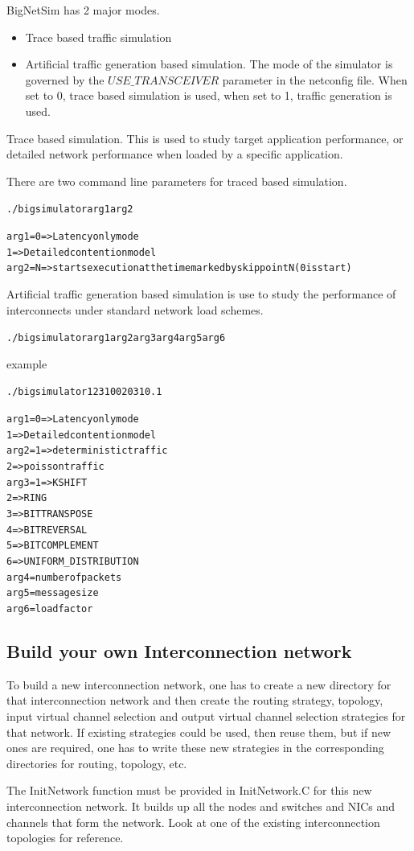 BigNetSim has 2 major modes.  

\begin{itemize}
\item{ Trace based traffic simulation }
\item{Artificial traffic generation based simulation.
The mode of the simulator is governed by the $USE\_TRANSCEIVER$ parameter
in the netconfig file.  When set to 0, trace based simulation is used,
when set to 1, traffic generation is used.}
\end{itemize}

Trace based simulation.  This is used to study target application
performance, or detailed network performance when loaded by a specific
application.

There are two command line parameters for traced based simulation.
\begin{alltt}./bigsimulator arg1 arg2\end{alltt}
\begin{alltt}
	arg1 = 0 => Latency only mode
	       1 => Detailed contention model
	arg2 = N => starts execution at the time marked by skip point N	(0 is start) 
\end{alltt}

Artificial traffic generation based simulation is use to study the performance of interconnects under standard network load schemes.


\begin{alltt}./bigsimulator arg1 arg2 arg3 arg4 arg5 arg6\end{alltt}
example
\begin{alltt}./bigsimulator 1 2 3 100 2031 0.1\end{alltt}

\begin{alltt}
	arg1 = 0 => Latency only mode
	       1 => Detailed contention model
	arg2 = 1 => deterministic traffic
	       2 => poisson traffic
	arg3 = 1 => KSHIFT 
	       2 => RING 
	       3 => BITTRANSPOSE 
	       4 => BITREVERSAL 
	       5 => BITCOMPLEMENT 
	       6 => UNIFORM\_DISTRIBUTION 
	arg4 = number of packets
	arg5 = message size
	arg6 = load factor
\end{alltt}

\subsection{Build your own Interconnection network}
To build a new interconnection network, one has to create a new directory
for that interconnection network and then create the routing strategy,
topology, input virtual channel selection and output virtual channel selection
strategies for that network. If existing strategies could be used, then
reuse them, but if new ones are required, one has to write these new
strategies in the corresponding directories for routing, topology, etc.

The InitNetwork function must be provided in InitNetwork.C for this 
new interconnection network. It builds up all the nodes and 
switches and NICs and channels that form the network. Look at one
of the existing interconnection topologies for reference.

